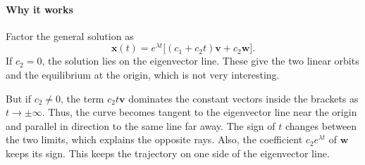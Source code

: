 \documentclass[11pt,letterpaper]{article}
\begin{document}
\paragraph{Why it works}
Factor the general solution as
\[
\mathbf{x}(t)=e^{\lambda t}\big[(c_1+c_2t)\mathbf{v}+c_2\mathbf{w}\big].
\]
If $c_2=0$, the solution lies on the eigenvector line. These give the two linear orbits and the equilibrium at the origin, which is not very interesting.

But if $c_2\ne0$, the term $c_2t\mathbf{v}$ dominates the constant vectors inside the brackets as $t\to\pm\infty$. Thus, the curve becomes tangent to the eigenvector line near the origin and parallel in direction to the same line far away. The sign of $t$ changes between the two limits, which explains the opposite rays. Also, the coefficient $c_2e^{\lambda t}$ of $\mathbf{w}$ keeps its sign. This keeps the trajectory on one side of the eigenvector line.

\end{document}
